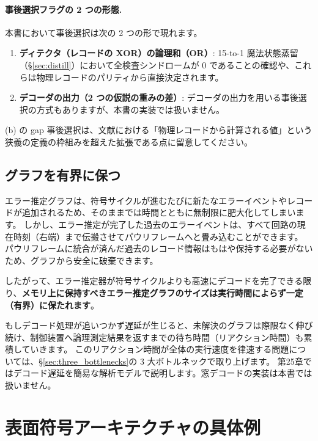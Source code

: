 \begin{notebox}
  \paragraph{事後選択フラグの 2 つの形態.}
  本書において事後選択は次の 2 つの形で現れます。
  \begin{enumerate}
    \item[(a)] \textbf{ディテクタ（レコードの XOR）の論理和（OR）}: 15-to-1 魔法状態蒸留（§\ref{sec:distill}）において全検査シンドロームが 0 であることの確認や、これらは物理レコードのパリティから直接決定されます。
    \item[(b)] \textbf{デコーダの出力（2 つの仮説の重みの差）}: デコーダの出力を用いる事後選択の方式もありますが、本書の実装では扱いません。
  \end{enumerate}
  (b) の gap 事後選択は、文献\cite{suzuki2026ftqc}における「物理レコードから計算される値」という狭義の定義の枠組みを超えた拡張である点に留意してください。
\end{notebox}

\subsection{グラフを有界に保つ}

エラー推定グラフは、符号サイクルが進むたびに新たなエラーイベントやレコードが追加されるため、そのままでは時間とともに無制限に肥大化してしまいます。
しかし、エラー推定が完了した過去のエラーイベントは、すべて回路の現在時刻（右端）まで伝搬させてパウリフレームへと畳み込むことができます。
パウリフレームに統合が済んだ過去のレコード情報はもはや保持する必要がないため、グラフから安全に破棄できます。

したがって、エラー推定器が符号サイクルよりも高速にデコードを完了できる限り、\textbf{メモリ上に保持すべきエラー推定グラフのサイズは実行時間によらず一定（有界）に保たれます}。

もしデコード処理が追いつかず遅延が生じると、未解決のグラフは際限なく伸び続け、制御装置へ論理測定結果を返すまでの待ち時間（リアクション時間）も累積していきます。
このリアクション時間が全体の実行速度を律速する問題については、§\ref{sec:three_bottlenecks}の 3 大ボトルネックで取り上げます。
第25章ではデコード遅延を簡易な解析モデルで説明します。窓デコードの実装は本書では扱いません。

\section{表面符号アーキテクチャの具体例}\label{sec:surface_arch}

